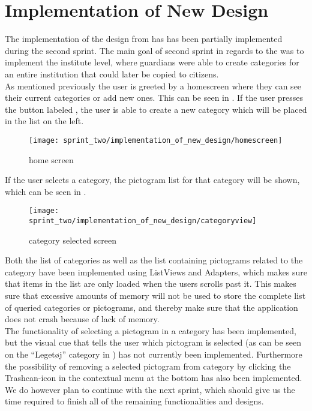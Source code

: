 \section{Implementation of New Design}
\label{sec:implementation_of_new_design}

The implementation of the design from  has has been partially implemented during the second sprint. The main goal of second sprint in regards to the \ct was to implement the institute level, where guardians were able to create categories for an entire institution that could later be copied to citizens.\\

As mentioned previously the user is greeted by a homescreen where they can see their current categories or add new ones. This can be seen in . If the user presses the button labeled , the user is able to create a new category which will be placed in the list on the left. 

\begin{figure}[!htbp]
    \centering
    \texttt{[image: sprint\_two/implementation\_of\_new\_design/homescreen]}
    \caption{\ct home screen}
    \label{fig:ct_home_screen}
\end{figure}

If the user selects a category, the pictogram list for that category will be shown, which can be seen in .\\

\begin{figure}[!htbp]
    \centering
    \texttt{[image: sprint\_two/implementation\_of\_new\_design/categoryview]}
    \caption{\ct category selected screen}
    \label{fig:ct_category_view}
\end{figure}


Both the list of categories as well as the list containing pictograms related to the category have been implemented using ListViews and Adapters, which makes sure that items in the list are only loaded when the users scrolls past it. This makes sure that excessive amounts of memory will not be used to store the complete list of queried categories or pictograms, and thereby make sure that the application does not crash because of lack of memory. \\

The functionality of selecting a pictogram in a category has been implemented, but the visual cue that tells the user which pictogram is selected (as can be seen on the ``Leget\o j'' category in ) has not currently been implemented. Furthermore the possibility of removing a selected pictogram from category by clicking the Trashcan-icon in the contextual menu at the bottom has also been implemented. We do however plan to continue with the \ct next sprint, which should give us the time required to finish all of the remaining functionalities and designs.  